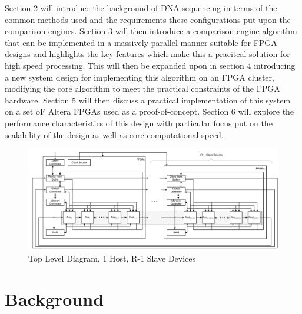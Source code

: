 \documentclass[conference]{IEEEtran}
\begin{document}
Section 2 will introduce the background of DNA sequencing in terms of the common methods used and the requirements these configurations put upon the comparison engines. Section 3 will then introduce a comparison engine algorithm that can be implemented in a massively parallel manner suitable for FPGA designs and highlights the key features which make this a pracitcal solution for high speed processing. This will then be expanded upon in section 4 introducing a new system design for implementing this algorithm on an FPGA cluster, modifying the core algorithm to meet the practical constraints of the FPGA hardware. Section 5 will then discuss a practical implementation of this system on a set oF Altera FPGAs used as a proof-of-concept. Section 6 will explore the performance characteristics of this design with particular focus put on the scalability of the design as well as core computational speed.
\begin{center}
\begin{figure}
  \includegraphics[width=\textwidth]{./figs/MFPGA.pdf}
  \caption{Top Level Diagram, 1 Host, R-1 Slave Devices}
  \label{fig:tld}
\end{figure}
\end{center}
\section{Background}
\end{document}
